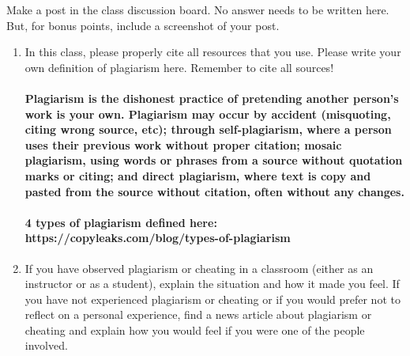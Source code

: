 \documentclass{article}
\begin{document}

Make a post in the class discussion board. No answer needs to be written here.
But, for bonus points, include a screenshot of your post.



\begin{enumerate}

    \item In this class, please properly cite all resources that you use. Please
        write your own definition of plagiarism here.  Remember to cite all
        sources!

        \paragraph{Plagiarism is the dishonest practice of pretending another person's work is your own. Plagiarism may occur by accident (misquoting, citing wrong source, etc); through self-plagiarism, where a person uses their previous work without proper citation; mosaic plagiarism, using words or phrases from a source without quotation marks or citing; and direct plagiarism, where text is copy and pasted from the source without citation, often without any changes.}
        \paragraph{4 types of plagiarism defined here: https://copyleaks.com/blog/types-of-plagiarism}

    \item If you have observed plagiarism or cheating in a classroom (either as
        an instructor or as a student), explain the situation and how it made
        you feel.  If you have not experienced plagiarism or cheating or if you
        would prefer not to reflect on a personal experience, find a news
        article about plagiarism or cheating and explain how you would feel if
        you were one of the people involved.


\end{enumerate}
\end{document}
